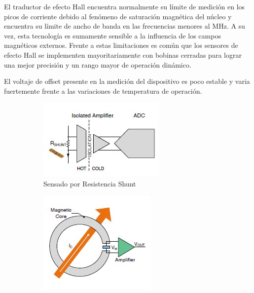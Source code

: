 \documentclass[10pt,a4paper]{article}
\begin{document}
	El traductor de efecto Hall encuentra normalmente su límite de medición en los picos de corriente debido al fenómeno de saturación magnética del núcleo y encuentra su límite de ancho de banda en las frecuencias menores al MHz. A su vez, esta tecnología es sumamente sensible a la influencia de los campos magnéticos externos. Frente a estas limitaciones es común que los sensores de efecto Hall se implementen mayoritariamente con bobinas cerradas para lograr una mejor precisión y un rango mayor de operación dinámico.
	
	El voltaje de offset presente en la medición del dispositivo es poco estable y varia fuertemente frente a las variaciones de temperatura de operación.
	
	\begin{figure}[h!]
		\centering
		\begin{subfigure}[b]{0.4\linewidth}
			\includegraphics[width=\linewidth]{../assets/R-Shunt_Isolated_Sensor.jpg}
			\caption{Sensado por Resistencia Shunt}
		\end{subfigure}%
        \hspace{15mm}
		\begin{subfigure}[b]{0.4\linewidth}
			\includegraphics[width=\linewidth]{../assets/Open-loop_Hall_Sensor.jpg}

\end{subfigure}
\end{figure}
\end{document}
